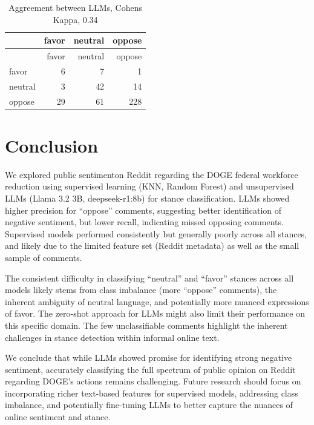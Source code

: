 \documentclass[
  12pt]{article}
\begin{document}
\begin{longtable}[]{@{}lrrr@{}}
\caption{Aggreement between LLMs, Cohens Kappa, 0.34}\tabularnewline
\toprule\noalign{}
& favor & neutral & oppose \\
\midrule\noalign{}
\endfirsthead
\toprule\noalign{}
& favor & neutral & oppose \\
\midrule\noalign{}
\endhead
\bottomrule\noalign{}
\endlastfoot
favor & 6 & 7 & 1 \\
neutral & 3 & 42 & 14 \\
oppose & 29 & 61 & 228 \\
\end{longtable}

\section{Conclusion}\label{conclusion}

We explored public sentimenton Reddit regarding the DOGE federal
workforce reduction using supervised learning (KNN, Random Forest) and
unsupervised LLMs (Llama 3.2 3B, deepseek-r1:8b) for stance
classification. LLMs showed higher precision for ``oppose'' comments,
suggesting better identification of negative sentiment, but lower
recall, indicating missed opposing comments. Supervised models performed
consistently but generally poorly across all stances, and likely due to
the limited feature set (Reddit metadata) as well as the small sample of
comments.

The consistent difficulty in classifying ``neutral'' and ``favor''
stances across all models likely stems from class imbalance (more
``oppose'' comments), the inherent ambiguity of neutral language, and
potentially more nuanced expressions of favor. The zero-shot approach
for LLMs might also limit their performance on this specific domain. The
few unclassifiable comments highlight the inherent challenges in stance
detection within informal online text.

We conclude that while LLMs showed promise for identifying strong
negative sentiment, accurately classifying the full spectrum of public
opinion on Reddit regarding DOGE's actions remains challenging. Future
research should focus on incorporating richer text-based features for
supervised models, addressing class imbalance, and potentially
fine-tuning LLMs to better capture the nuances of online sentiment and
stance.
\end{document}
